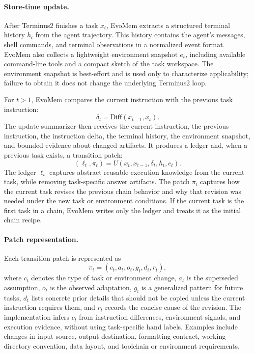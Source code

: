 \documentclass{article}
\begin{document}
\paragraph{Store-time update.}
After Terminus2 finishes a task $x_t$, EvoMem extracts a structured terminal history $h_t$ from the agent trajectory. This history contains the agent's messages, shell commands, and terminal observations in a normalized event format. EvoMem also collects a lightweight environment snapshot $e_t$, including available command-line tools and a compact sketch of the task workspace. The environment snapshot is best-effort and is used only to characterize applicability; failure to obtain it does not change the underlying Terminus2 loop.

For $t>1$, EvoMem compares the current instruction with the previous task instruction:
\[
\delta_t=\mathrm{Diff}(x_{t-1},x_t).
\]
The update summarizer then receives the current instruction, the previous instruction, the instruction delta, the terminal history, the environment snapshot, and bounded evidence about changed artifacts. It produces a ledger and, when a previous task exists, a transition patch:
\[
(\ell_t,\pi_t)=U(x_t,x_{t-1},\delta_t,h_t,e_t).
\]
The ledger $\ell_t$ captures abstract reusable execution knowledge from the current task, while removing task-specific answer artifacts. The patch $\pi_t$ captures how the current task revises the previous chain behavior and why that revision was needed under the new task or environment conditions. If the current task is the first task in a chain, EvoMem writes only the ledger and treats it as the initial chain recipe.

\paragraph{Patch representation.}
Each transition patch is represented as
\[
\pi_t =
\left(
c_t,
a_t,
o_t,
g_t,
d_t,
r_t
\right),
\]
where $c_t$ denotes the type of task or environment change, $a_t$ is the superseded assumption, $o_t$ is the observed adaptation, $g_t$ is a generalized pattern for future tasks, $d_t$ lists concrete prior details that should not be copied unless the current instruction requires them, and $r_t$ records the concise cause of the revision. The implementation infers $c_t$ from instruction differences, environment signals, and execution evidence, without using task-specific hand labels. Examples include changes in input source, output destination, formatting contract, working directory convention, data layout, and toolchain or environment requirements.
\end{document}
